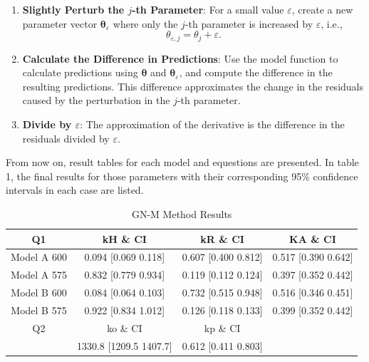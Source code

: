 \documentclass[a4paper,12pt]{article} %
\begin{document}
\begin{enumerate}
    \item \textbf{Slightly Perturb the $j$-th Parameter}: For a small value $\varepsilon$, create a new parameter vector $\boldsymbol{\theta}_\varepsilon$ where only the $j$-th parameter is increased by $\varepsilon$, i.e., 
    \[ \theta_{\varepsilon,j} = \theta_j + \varepsilon. \]
    
    \item \textbf{Calculate the Difference in Predictions}: Use the model function to calculate predictions using $\boldsymbol{\theta}$ and $\boldsymbol{\theta}_\varepsilon$, and compute the difference in the resulting predictions. This difference approximates the change in the residuals caused by the perturbation in the $j$-th parameter.
    
    \item \textbf{Divide by $\varepsilon$}: The approximation of the derivative is the difference in the residuals divided by $\varepsilon$.
\end{enumerate}


From now on, result tables for each model and equestions are presented. In table 1, the final results for
those parameters with their corresponding 95\% confidence intervals in each case are listed.

\begin{table}[ht]
    \caption{GN-M Method Results}
    \centering
    \begin{tabular}{|c|c|c|c|}
        \hline
        Q1 & kH \& CI & kR \& CI& KA \& CI\\
        \hline   
        Model A 600& 0.094 [0.069 0.118]& 0.607 [0.400 0.812]& 0.517 [0.390 0.642] \\
        Model A 575& 0.832 [0.779 0.934]& 0.119 [0.112 0.124]& 0.397 [0.352 0.442] \\
        Model B 600& 0.084 [0.064 0.103]& 0.732 [0.515 0.948]& 0.516 [0.346 0.451] \\
        Model B 575& 0.922 [0.834 1.012]& 0.126 [0.118 0.133]& 0.399 [0.352 0.442]\\
        \hline
        Q2 & ko \& CI& kp \& CI&\\
        \hline
        & 1330.8 [1209.5 1407.7] & 0.612 [0.411 0.803] &  \\
        \hline
    \end{tabular}
\end{table}
\end{document}
